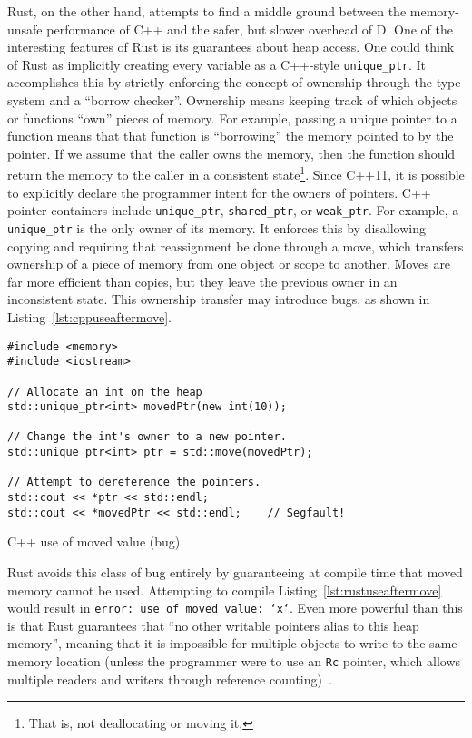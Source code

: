 \documentclass[finalcopy]{srpaper}
\begin{document}
Rust, on the other hand, attempts to find a middle ground between the
memory-unsafe performance of C++ and the safer, but slower overhead of D. One
of the interesting features of Rust is its guarantees about heap access. One
could think of Rust as implicitly creating every variable as a C++-style
\texttt{unique\_ptr}. It accomplishes this by strictly enforcing the concept of
ownership through the type system and a ``borrow checker''. Ownership means
keeping track of which objects or functions ``own'' pieces of memory. For
example, passing a unique pointer to a function means that that function is
``borrowing'' the memory pointed to by the pointer. If we assume that the
caller owns the memory, then the function should return the memory to the
caller in a consistent state\footnote{That is, not deallocating or moving it.}.
Since C++11, it is possible to explicitly declare the programmer intent for the
owners of pointers. C++ pointer containers include \texttt{unique\_ptr},
\texttt{shared\_ptr}, or \texttt{weak\_ptr}. For example, a
\texttt{unique\_ptr} is the only owner of its memory. It enforces this by
disallowing copying and requiring that reassignment be done through a move,
which transfers ownership of a piece of memory from one object or scope to
another. Moves are far more efficient than copies, but they leave the previous
owner in an inconsistent state. This ownership transfer may introduce bugs, as
shown in Listing~\ref{lst:cppuseaftermove}.

\begin{listing}[h]
\begin{verbatim}
#include <memory>
#include <iostream>

// Allocate an int on the heap
std::unique_ptr<int> movedPtr(new int(10));

// Change the int's owner to a new pointer.
std::unique_ptr<int> ptr = std::move(movedPtr);

// Attempt to dereference the pointers.
std::cout << *ptr << std::endl;
std::cout << *movedPtr << std::endl;    // Segfault!
\end{verbatim}
\caption{C++ use of moved value (bug)}
\label{lst:cppuseaftermove}
\end{listing}

Rust avoids this class of bug entirely by guaranteeing at compile time that
moved memory cannot be used. Attempting to compile
Listing~\ref{lst:rustuseaftermove} would result in \texttt{error: use of moved
value: `x`}. Even more powerful than this is that Rust guarantees that ``no
other writable pointers alias to this heap memory'', meaning that it is
impossible for multiple objects to write to the same memory location (unless
the programmer were to use an \texttt{Rc} pointer, which allows multiple
readers and writers through reference counting)~\cite{RustPointerGuide}.
\end{document}
